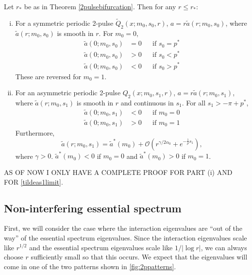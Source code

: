 \documentclass[thesis.tex]{subfiles}
\begin{document}
\begin{lemma}\label{lemma:chara}
Let $r_*$ be as in Theorem \ref{2pulsebifurcation}. Then for any $r \leq r_*$:
\begin{enumerate}[(i)]
	\item For a symmetric periodic 2-pulse $\tilde{Q}_2(x; m_0, s_0, r)$, $a = r \tilde{a}(r; m_0, s_0)$, where $\tilde{a}(r; m_0, s_0)$ is smooth in $r$. For $m_0 = 0$,
	\begin{equation}
	\begin{aligned}
	\tilde{a}(0; m_0, s_0) &= 0 && \text{if }s_0 = p^* \\
	\tilde{a}(0; m_0, s_0) &> 0 && \text{if }s_0 < p^* \\
	\tilde{a}(0; m_0, s_0) &< 0 && \text{if }s_0 > p^*
	\end{aligned}
	\end{equation}
	These are reversed for $m_0 = 1$.
	\item For an asymmetric periodic 2-pulse $Q_2(x; m_0, s_1, r)$, $a = r \tilde{a}(r; m_0, s_1)$, where $\tilde{a}(r; m_0, s_1)$ is smooth in $r$ and continuous in $s_1$. For all $s_1 > -\pi + p^*$,
	\begin{equation}
	\begin{aligned}
	\tilde{a}(0; m_0, s_1) &< 0 && \text{if }m_0 = 0 \\
	\tilde{a}(0; m_0, s_1) &> 0 && \text{if }m_0 = 1
	\end{aligned}
	\end{equation}
	Furthermore,
	\begin{equation}\label{tildeas1limit}
	\tilde{a}(r; m_0, s_1) = \tilde{a}^*(m_0) + \mathcal{O}\left(r^{\gamma/2\alpha_0} + e^{-\frac{1}{\rho}s_1} \right),
	\end{equation}
	where $\gamma > 0$. $\tilde{a}^*(m_0) < 0$ if $m_0 = 0$ and $\tilde{a}^*(m_0) > 0$ if $m_0 = 1$.
\end{enumerate}	
\end{lemma}
AS OF NOW I ONLY HAVE A COMPLETE PROOF FOR PART (i) AND FOR \cref{tildeas1limit}.

\subsection{Non-interfering essential spectrum }

First, we will consider the case where the interaction eigenvalues are ``out of the way'' of the essential spectrum eigenvalues. Since the interaction eigenvalues scale like $r^{1/2}$ and the essential spectrum eigenvalues scale like $1/|\log r|$, we can always choose $r$ sufficiently small so that this occurs. We expect that the eigenvalues will come in one of the two patterns shown in \cref{fig:2ppatterns}.
\end{document}
